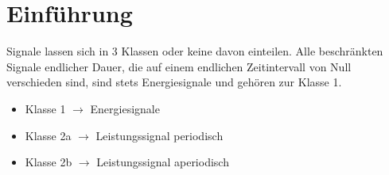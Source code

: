 \section{Einführung}
Signale lassen sich in 3 Klassen oder keine davon einteilen. Alle beschränkten Signale endlicher Dauer, die auf einem endlichen Zeitintervall von Null verschieden sind, sind stets Energiesignale und gehören zur Klasse 1. \\

\begin{itemize}[nosep]
	\item  Klasse 1 $\rightarrow$ Energiesignale
	\item Klasse 2a $\rightarrow$ Leistungssignal periodisch
	\item Klasse 2b $\rightarrow$ Leistungssignal aperiodisch
\end{itemize} 

\begin{center}
\end{center}



